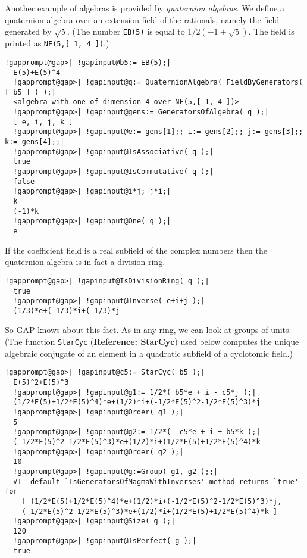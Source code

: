 \documentclass[a4paper,11pt]{report}
\begin{document}
{{ Another example of algebras is provided by \emph{quaternion algebras}. We define a quaternion algebra over an extension field of the rationals,
namely the field generated by $\sqrt{{5}}$. (The number \texttt{EB(5)} is equal to $1/2 (-1+\sqrt{{5}})$. The field is printed as \texttt{NF(5,[ 1, 4 ])}.) 

 
\begin{Verbatim}[commandchars=!@|,fontsize=\small,frame=single,label=Example]
  !gapprompt@gap>| !gapinput@b5:= EB(5);|
  E(5)+E(5)^4
  !gapprompt@gap>| !gapinput@q:= QuaternionAlgebra( FieldByGenerators( [ b5 ] ) );|
  <algebra-with-one of dimension 4 over NF(5,[ 1, 4 ])>
  !gapprompt@gap>| !gapinput@gens:= GeneratorsOfAlgebra( q );|
  [ e, i, j, k ]
  !gapprompt@gap>| !gapinput@e:= gens[1];; i:= gens[2];; j:= gens[3];; k:= gens[4];;|
  !gapprompt@gap>| !gapinput@IsAssociative( q );|
  true
  !gapprompt@gap>| !gapinput@IsCommutative( q );|
  false
  !gapprompt@gap>| !gapinput@i*j; j*i;|
  k
  (-1)*k
  !gapprompt@gap>| !gapinput@One( q );|
  e
\end{Verbatim}
 

 If the coefficient field is a real subfield of the complex numbers then the
quaternion algebra is in fact a division ring. 

 
\begin{Verbatim}[commandchars=!@|,fontsize=\small,frame=single,label=Example]
  !gapprompt@gap>| !gapinput@IsDivisionRing( q );|
  true
  !gapprompt@gap>| !gapinput@Inverse( e+i+j );|
  (1/3)*e+(-1/3)*i+(-1/3)*j
\end{Verbatim}
 

 So \textsf{GAP} knows about this fact. As in any ring, we can look at groups of units. (The
function \texttt{StarCyc} (\textbf{Reference: StarCyc}) used below computes the unique algebraic conjugate of an element in a
quadratic subfield of a cyclotomic field.) 

 
\begin{Verbatim}[commandchars=!@|,fontsize=\small,frame=single,label=Example]
  !gapprompt@gap>| !gapinput@c5:= StarCyc( b5 );|
  E(5)^2+E(5)^3
  !gapprompt@gap>| !gapinput@g1:= 1/2*( b5*e + i - c5*j );|
  (1/2*E(5)+1/2*E(5)^4)*e+(1/2)*i+(-1/2*E(5)^2-1/2*E(5)^3)*j
  !gapprompt@gap>| !gapinput@Order( g1 );|
  5
  !gapprompt@gap>| !gapinput@g2:= 1/2*( -c5*e + i + b5*k );|
  (-1/2*E(5)^2-1/2*E(5)^3)*e+(1/2)*i+(1/2*E(5)+1/2*E(5)^4)*k
  !gapprompt@gap>| !gapinput@Order( g2 );|
  10
  !gapprompt@gap>| !gapinput@g:=Group( g1, g2 );;|
  #I  default `IsGeneratorsOfMagmaWithInverses' method returns `true' for 
    [ (1/2*E(5)+1/2*E(5)^4)*e+(1/2)*i+(-1/2*E(5)^2-1/2*E(5)^3)*j, 
    (-1/2*E(5)^2-1/2*E(5)^3)*e+(1/2)*i+(1/2*E(5)+1/2*E(5)^4)*k ]
  !gapprompt@gap>| !gapinput@Size( g );|
  120
  !gapprompt@gap>| !gapinput@IsPerfect( g );|
  true
\end{Verbatim}
 

}}
\end{document}
